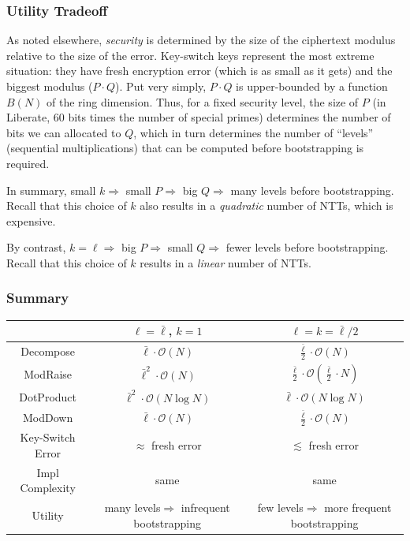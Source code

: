 \documentclass[../../fheimpl.tex]{subfiles}
\begin{document}
\subsubsection{Utility Tradeoff}
As noted elsewhere, \emph{security} is determined by the size of the ciphertext modulus relative to the size of the error. Key-switch keys represent the most extreme situation: they have fresh encryption error (which is as small as it gets) and the biggest modulus ($P\cdot Q$). Put very simply, $P\cdot Q$ is upper-bounded by a function $B(N)$ of the ring dimension. Thus, for a fixed security level, the size of $P$ (in Liberate, 60 bits times the number of special primes) determines the number of bits we can allocated to $Q$, which in turn determines the number of ``levels'' (sequential multiplications) that can be computed before bootstrapping is required.

In summary, small $k \Rightarrow$ small $P \Rightarrow$ big $Q\Rightarrow$ many levels before bootstrapping. Recall that this choice of $k$ also results in a \emph{quadratic} number of NTTs, which is expensive.

By contrast, $k=\ell \Rightarrow$ big $P \Rightarrow$ small $Q\Rightarrow$ fewer levels before bootstrapping. Recall that this choice of $k$ results in a \emph{linear} number of NTTs.

\subsubsection{Summary}
{
	\renewcommand{\arraystretch}{1.5}
	\begin{center}
		\begin{tabular}{ |c|c|c| } 
			\hline
			& $\ell=\bar{\ell}$, $k = 1$ & $\ell = k = \bar{\ell}/2$ \\
			\hline
			Decompose  & $\bar{\ell}\cdot \mathcal{O}(N)$         & $\frac{\bar{\ell}}{2}\cdot\mathcal{O}(N)$                      \\
			ModRaise   & $\bar{\ell}^2\cdot \mathcal{O}(N)$       & $\frac{\bar{\ell}}{2}\cdot \mathcal{O}(\frac{\bar{\ell}}{2}\cdot N)$ \\
			DotProduct & $\bar{\ell}^2\cdot \mathcal{O}(N\log N)$ & $\bar{\ell}\cdot \mathcal{O}(N\log N)$                         \\
			ModDown    & $\bar{\ell}\cdot\mathcal{O}(N)$          & $\frac{\bar{\ell}}{2}\cdot\mathcal{O}(N)$                      \\
			Key-Switch Error & $\approx$ fresh error & $\lesssim$ fresh error \\
			Impl Complexity & same & same \\
			Utility & \makecell[c]{many levels$\Rightarrow$\\ infrequent bootstrapping} & \makecell[c]{few levels$\Rightarrow$\\more frequent bootstrapping} \\
			\hline
		\end{tabular}
	\end{center}
}
\end{document}
